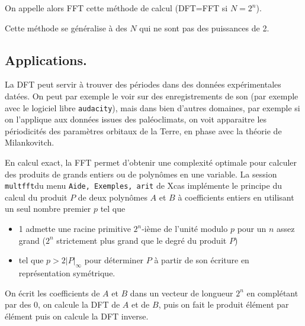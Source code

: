 \documentclass[a4paper,11pt]{article}
\begin{document}
\begin{giacjshere}
On appelle alors FFT cette méthode de calcul (DFT=FFT si $N=2^n$).

Cette m\'ethode se g\'en\'eralise \`a des $N$ qui ne sont pas des puissances
de 2.

\subsection{Applications.}
La DFT peut servir \`a trouver des p\'eriodes dans des donn\'ees
exp\'erimentales dat\'ees. On peut par exemple le voir sur
des enregistrements de son (par exemple avec le logiciel
libre \verb|audacity|), mais dans bien d'autres
domaines, par exemple si on l'applique aux donn\'ees
issues des pal\'eoclimats, on voit apparaitre les p\'eriodicit\'es
des param\`etres orbitaux de la Terre, en phase avec la th\'eorie
de Milankovitch.

En calcul exact, la FFT permet d'obtenir une complexit\'e optimale
pour calculer des produits de grands entiers ou de polyn\^omes
en une variable. La session \verb|multfft|du menu 
\verb|Aide, Exemples, arit| de Xcas impl\'emente le principe
du calcul du produit $P$ de deux polyn\^omes $A$ et $B$ \`a coefficients entiers
en utilisant un seul nombre premier $p$ tel que 
\begin{itemize}
\item 1 admette
une racine primitive $2^n$-i\`eme de l'unit\'e modulo $p$ 
pour un $n$ assez grand ($2^n$ strictement plus grand que le degr\'e
du produit $P$) 
\item tel que $p>2|P|_\infty$ pour d\'eterminer $P$ \`a partir de son
\'ecriture en repr\'esentation sym\'etrique.
\end{itemize}
On \'ecrit les coefficients de $A$ et $B$ dans un vecteur de longueur
$2^n$ en compl\'etant par des 0, on calcule la DFT de $A$ et de $B$,
puis on fait le produit \'el\'ement par \'el\'ement puis on calcule la
DFT inverse.


\end{giacjshere}
\end{document}
